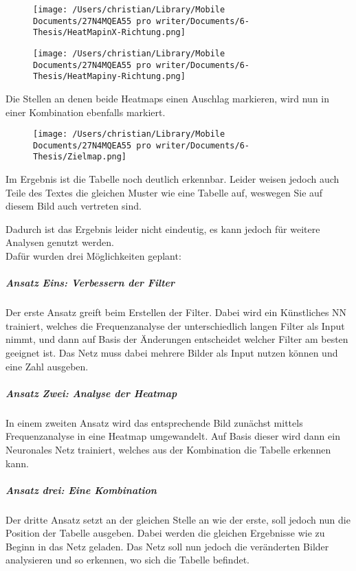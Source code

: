 \documentclass[
]{article}
\begin{document}
\begin{figure}
\centering
\texttt{[image: /Users/christian/Library/Mobile Documents/27N4MQEA55~pro~writer/Documents/6-Thesis/HeatMapinX-Richtung.png]}
\caption{}
\end{figure}

\begin{figure}
\centering
\texttt{[image: /Users/christian/Library/Mobile Documents/27N4MQEA55~pro~writer/Documents/6-Thesis/HeatMapiny-Richtung.png]}
\caption{}
\end{figure}

Die Stellen an denen beide Heatmaps einen Auschlag markieren, wird nun
in einer Kombination ebenfalls markiert.

\begin{figure}
\centering
\texttt{[image: /Users/christian/Library/Mobile Documents/27N4MQEA55~pro~writer/Documents/6-Thesis/Zielmap.png]}
\caption{}
\end{figure}

Im Ergebnis ist die Tabelle noch deutlich erkennbar. Leider weisen
jedoch auch Teile des Textes die gleichen Muster wie eine Tabelle auf,
weswegen Sie auf diesem Bild auch vertreten sind.

Dadurch ist das Ergebnis leider nicht eindeutig, es kann jedoch für
weitere Analysen genutzt werden. \\
Dafür wurden drei Möglichkeiten geplant:

\hypertarget{header-n98}{%
\subparagraph{Ansatz Eins: Verbessern der Filter}\label{header-n98}}

Der erste Ansatz greift beim Erstellen der Filter. Dabei wird ein
Künstliches NN trainiert, welches die Frequenzanalyse der
unterschiedlich langen Filter als Input nimmt, und dann auf Basis der
Änderungen entscheidet welcher Filter am besten geeignet ist. Das Netz
muss dabei mehrere Bilder als Input nutzen können und eine Zahl
ausgeben.

\hypertarget{header-n100}{%
\subparagraph{Ansatz Zwei: Analyse der Heatmap}\label{header-n100}}

In einem zweiten Ansatz wird das entsprechende Bild zunächst mittels
Frequenzanalyse in eine Heatmap umgewandelt. Auf Basis dieser wird dann
ein Neuronales Netz trainiert, welches aus der Kombination die Tabelle
erkennen kann.

\hypertarget{header-n102}{%
\subparagraph{Ansatz drei: Eine Kombination}\label{header-n102}}

Der dritte Ansatz setzt an der gleichen Stelle an wie der erste, soll
jedoch nun die Position der Tabelle ausgeben. Dabei werden die gleichen
Ergebnisse wie zu Beginn in das Netz geladen. Das Netz soll nun jedoch
die veränderten Bilder analysieren und so erkennen, wo sich die Tabelle
befindet.
\end{document}
